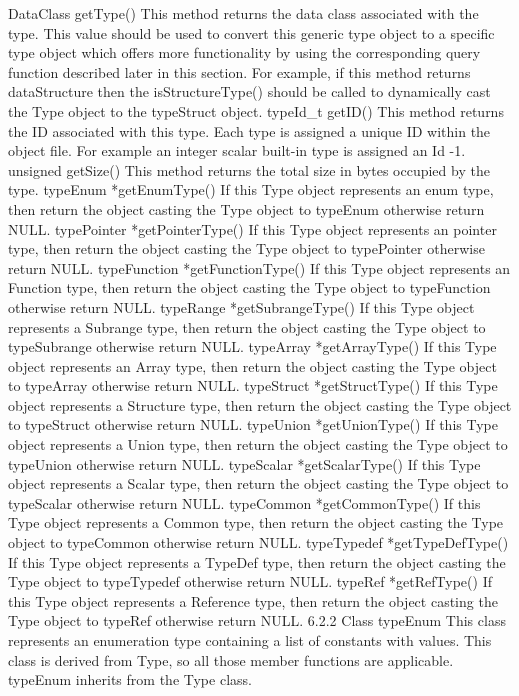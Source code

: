 DataClass getType()
This method returns the data class associated with the type. 
This value should be used to convert this generic type object to a specific type object which offers more functionality by using the corresponding query function described later in this section. For example, if this method returns dataStructure then the isStructureType() should be called to dynamically cast the Type object to the typeStruct object.
typeId_t getID()
This method returns the ID associated with this type.
Each type is assigned a unique ID within the object file. For example an integer scalar built-in type is assigned an Id -1.
unsigned getSize()
This method returns the total size in bytes occupied by the type.
typeEnum *getEnumType()
If this Type object represents an enum type, then return the object casting the Type object to typeEnum otherwise return NULL.
typePointer *getPointerType()
If this Type object represents an pointer type, then return the object casting the Type object to typePointer otherwise return NULL.
typeFunction *getFunctionType()
If this Type object represents an Function type, then return the object casting the Type object to typeFunction otherwise return NULL.
typeRange *getSubrangeType()
If this Type object represents a Subrange type, then return the object casting the Type object to typeSubrange otherwise return NULL.
typeArray *getArrayType()
If this Type object represents an Array type, then return the object casting the Type object to typeArray otherwise return NULL.
typeStruct *getStructType()
If this Type object represents a Structure type, then return the object casting the Type object to typeStruct otherwise return NULL.
typeUnion *getUnionType()
If this Type object represents a Union type, then return the object casting the Type object to typeUnion otherwise return NULL.
typeScalar *getScalarType()
If this Type object represents a Scalar type, then return the object casting the Type object to typeScalar otherwise return NULL.
typeCommon *getCommonType()
If this Type object represents a Common type, then return the object casting the Type object to typeCommon otherwise return NULL.
typeTypedef *getTypeDefType()
If this Type object represents a TypeDef type, then return the object casting the Type object to typeTypedef otherwise return NULL.
typeRef *getRefType()
If this Type object represents a Reference type, then return the object casting the Type object to typeRef otherwise return NULL.
6.2.2 Class typeEnum
This class represents an enumeration type containing a list of constants with values. This class is derived from Type, so all those member functions are applicable. typeEnum inherits from the Type class.
